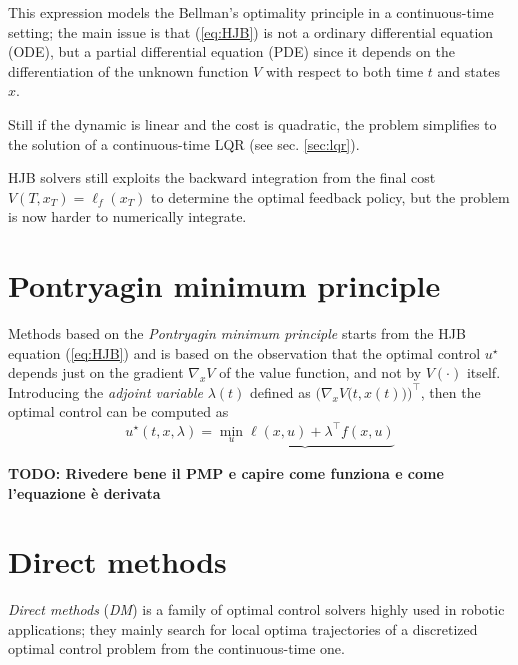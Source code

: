 	This expression models the Bellman's optimality principle in a continuous-time setting; the main issue is that (\ref{eq:HJB}) is not a ordinary differential equation (ODE), but a partial differential equation (PDE) since it depends on the differentiation of the unknown function $V$ with respect to both time $t$ and states $x$.
	
	Still if the dynamic is linear and the cost is quadratic, the problem simplifies to the solution of a continuous-time LQR (see sec. \ref{sec:lqr}).
	
	HJB solvers still exploits the backward integration from the final cost $V(T,x_T) = \ell_f(x_T)$ to determine the optimal feedback policy, but the problem is now harder to numerically integrate.
	
\section{Pontryagin minimum principle}
	Methods based on the \textit{Pontryagin minimum principle} starts from the HJB equation (\ref{eq:HJB}) and is based on the observation that the optimal control $u^\star$ depends just on the gradient $\nabla_x V$ of the value function, and not by $V(\cdot)$ itself. Introducing the \textit{adjoint variable} $\lambda(t)$ defined as  $\Big(\nabla_x V\big(t, x(t)\big) \Big)^\top $, then the optimal control can be computed as
	\begin{equation}
		u^\star (t, x, \lambda) = \underbrace{\min_u \ell(x,u) + \lambda^\top  f(x,u)}
	\end{equation}
	
	\textbf{TODO: Rivedere bene il PMP e capire come funziona e come l'equazione è  derivata}
	
\section{Direct methods}
	\textit{Direct methods} (\textit{DM}) is a family of optimal control solvers highly used in robotic applications; they mainly search for local optima trajectories of a discretized optimal control problem from the continuous-time one.
	
